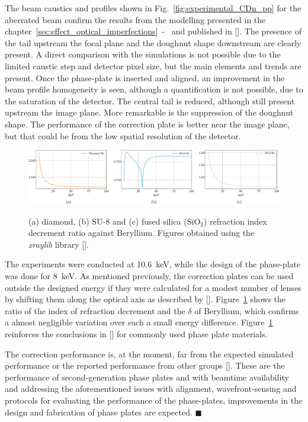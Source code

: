 \begin{refsection}
The beam caustics and profiles shown in Fig.~\ref{fig:experimental_CDn_pp} for the aberrated beam confirm the results from the modelling presented in the chapter~\ref{sec:effect_optical_imperfections}~-~\textit{} and published in [\cite{Celestre2020}]. The presence of the tail upstream the focal plane and the doughnut shape downstream are clearly present. A direct comparison with the simulations is not possible due to the limited caustic step and detector pixel size, but the main elements and trends are present. Once the phase-plate is inserted and aligned, an improvement in the beam profile homogeneity is seen, although a quantification is not possible, due to the saturation of the detector. The central tail is reduced, although still present upstream the image plane. More remarkable is the suppression of the doughnut shape. The performance of the correction plate is better near the image plane, but that could be from the low spatial resolution of the detector. 

\begin{figure}[t]
    \centering
    {\includegraphics[width=1\linewidth]{figures/ch03/n_plate.pdf}}
    \caption[Index of refraction ratio for common phase plate materials]{(a) diamond, (b) SU-8 and (c) fused silica (SiO$_2$) refraction index decrement ratio against Beryllium. Figures obtained using the \textit{xraylib} library [\cite{Brunetti2004, Schoonjans2011}].}
    \label{fig:delta_correction_plate}
\end{figure}
The experiments were conducted at 10.6~keV, while the design of the phase-plate was done for 8~keV. As mentioned previously, the correction plates can be used outside the designed energy if they were calculated for a modest number of lenses by shifting them along the optical axis as described by [\cite[\textit{\S6}]{Seiboth2018}]. Figure~\ref{fig:delta_correction_plate} shows the ratio of the index of refraction decrement and the $\delta$ of Beryllium, which confirms a almost negligible variation over such a small energy difference. Figure~\ref{fig:delta_correction_plate} reinforces the conclusions in [\cite[\textit{\S6}]{Seiboth2018}] for commonly used phase plate materials.

The correction performance is, at the moment, far from the expected simulated performance or the reported performance from other groups [\cite{Seiboth2017,Seiboth2018,Seiboth2020,Dhamgaye2020}]. These are the performance of second-generation phase plates and with beamtime availability and addressing the aforementioned issues with alignment, wavefront-sensing and protocols for evaluating the performance of the phase-plates, improvements in the design and fabrication of phase plates are expected.  $\blacksquare$

\printbibliography[heading=subbibliography]
\end{refsection}
